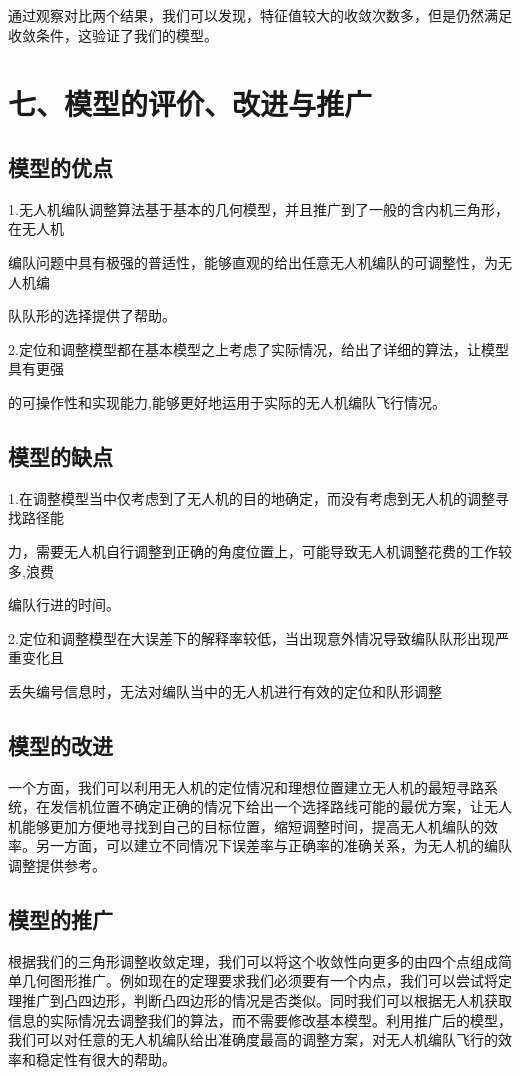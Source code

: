\documentclass{my_paper}
\begin{document}
通过观察对比两个结果，我们可以发现，特征值较大的收敛次数多，但是仍然满足收敛条件，这验证了我们的模型。

\section{七、模型的评价、改进与推广}
\subsection{模型的优点}
1.无人机编队调整算法基于基本的几何模型，并且推广到了一般的含内机三角形，在无人机

\quad 编队问题中具有极强的普适性，能够直观的给出任意无人机编队的可调整性，为无人机编

\quad 队队形的选择提供了帮助。

2.定位和调整模型都在基本模型之上考虑了实际情况，给出了详细的算法，让模型具有更强

\quad 的可操作性和实现能力,能够更好地运用于实际的无人机编队飞行情况。
\subsection{模型的缺点}
1.在调整模型当中仅考虑到了无人机的目的地确定，而没有考虑到无人机的调整寻找路径能

\quad 力，需要无人机自行调整到正确的角度位置上，可能导致无人机调整花费的工作较多,浪费

\quad 编队行进的时间。

2.定位和调整模型在大误差下的解释率较低，当出现意外情况导致编队队形出现严重变化且

\quad 丢失编号信息时，无法对编队当中的无人机进行有效的定位和队形调整
\subsection{模型的改进}
一个方面，我们可以利用无人机的定位情况和理想位置建立无人机的最短寻路系统，在发信机位置不确定正确的情况下给出一个选择路线可能的最优方案，让无人机能够更加方便地寻找到自己的目标位置，缩短调整时间，提高无人机编队的效率。另一方面，可以建立不同情况下误差率与正确率的准确关系，为无人机的编队调整提供参考。
\subsection{模型的推广}
根据我们的三角形调整收敛定理，我们可以将这个收敛性向更多的由四个点组成简单几何图形推广。例如现在的定理要求我们必须要有一个内点，我们可以尝试将定理推广到凸四边形，判断凸四边形的情况是否类似。同时我们可以根据无人机获取信息的实际情况去调整我们的算法，而不需要修改基本模型。利用推广后的模型，我们可以对任意的无人机编队给出准确度最高的调整方案，对无人机编队飞行的效率和稳定性有很大的帮助。
\end{document}
